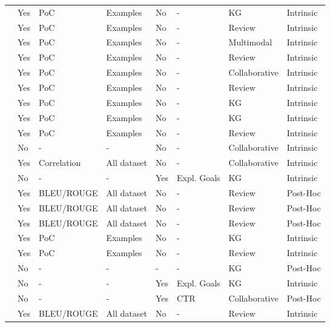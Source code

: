 \begin{xltabular}{\textwidth}{l|l|l|l|l|l|l|l}
\cite{10.1145/3308558.3313705} & Yes & PoC & Examples & No & - & KG & Intrinsic \\
\cite{10.1145/3397271.3401137} & Yes & PoC & Examples & No & - & Review & Intrinsic \\
\cite{10.1145/3343031.3351034} & Yes & PoC & Examples & No & - & Multimodal & Intrinsic \\
\cite{10.1145/2806416.2806504} & Yes & PoC & Examples & No & - & Review & Intrinsic \\
\cite{10.1145/3159652.3159668} & Yes & PoC & Examples & No & - & Collaborative & Intrinsic \\
\cite{10.1145/3109859.3109890} & Yes & PoC & Examples & No & - & Review & Intrinsic \\
\cite{10.1145/3331184.3331203} & Yes & PoC & Examples & No & - & KG & Intrinsic \\
\cite{10.1145/3442381.3450133} & Yes & PoC & Examples & No & - & KG & Intrinsic \\
\cite{10.1145/3178876.3186145} & Yes & PoC & Examples & No & - & Review & Intrinsic \\
\cite{10.1145/3178876.3186154} & No & - & - & No & - & Collaborative & Intrinsic \\
\cite{10.1145/3442381.3449788} & Yes & Correlation & All dataset & No & - & Collaborative & Intrinsic \\
\cite{10.1145/3631700.3665226} & No & - & - & Yes & Expl. Goals & KG & Intrinsic \\
\cite{10.1145/3637528.3671781} & Yes & BLEU/ROUGE & All dataset & No & - & Review & Post-Hoc \\
\cite{10.1145/3543507.3583260} & Yes & BLEU/ROUGE & All dataset & No & - & Review & Post-Hoc \\
\cite{10.1145/3624918.3625331} & Yes & BLEU/ROUGE & All dataset & No & - & Review & Post-Hoc \\
\cite{10.1145/3485447.3511937} & Yes & PoC & Examples & No & - & KG & Intrinsic \\
\cite{10.1145/3485447.3512029} & Yes & PoC & Examples & No & - & Review & Intrinsic \\
\cite{10.1145/3604915.3609491} & No & - & - & - & - & KG & Post-Hoc \\
\cite{10.1145/3636555.3636898} & No & - & - & Yes & Expl. Goals & KG & Intrinsic \\
\cite{10.1145/3616855.3635855} & No & - & - & Yes & CTR & Collaborative & Post-Hoc \\
\cite{10.1145/3539618.3591776} & Yes & BLEU/ROUGE & All dataset & No & - & Review & Intrinsic \\

\end{xltabular}
